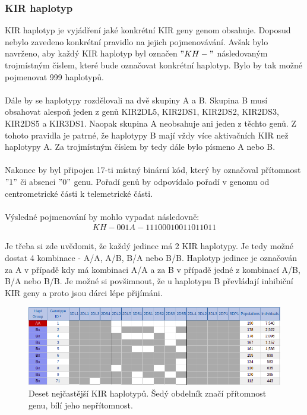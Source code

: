 \documentclass[czech,DP]{thesiskiv}
\numberwithin{equation}{section}
\begin{document}
\subsubsection{KIR haplotyp}
KIR haplotyp je vyjádření jaké konkrétní KIR geny genom obsahuje. Doposud nebylo zavedeno konkrétní pravidlo na jejich pojmenovávání. Avšak bylo navrženo, aby každý KIR haplotyp byl označen $"KH-"$ následovaným trojmístným číslem, které bude označovat konkrétní haplotyp. Bylo by tak možné pojmenovat 999 haplotypů. \cite{imgt_hla_database}
\\
\\
Dále by se haplotypy rozdělovali na dvě skupiny A a B. Skupina B musí obsahovat alespoň jeden z genů KIR2DL5, KIR2DS1, KIR2DS2, KIR2DS3, KIR2DS5 a KIR3DS1. Naopak skupina A neobsahuje ani jeden z těchto genů. Z tohoto pravidla je patrné, že haplotypy B mají vždy více aktivačních KIR než haplotypy A. Za trojmístným číslem by tedy dále bylo písmeno A nebo B.
\\
\\
Nakonec by byl připojen 17-ti místný binární kód, který by označoval přítomnost $"1"$ či absenci $"0"$ genu. Pořadí genů by odpovídalo pořadí v genomu od centrometrické části k telemetrické části.
\\
\\
Výsledné pojmenování by mohlo vypadat následovně:
\begin{align}
   \label{kir_haplotyp} KH-001A-11100010011011011
\end{align}

\noindent
Je třeba si zde uvědomit, že každý jedinec má 2 KIR haplotypy. Je tedy možné dostat 4 kombinace - A/A, A/B, B/A nebo B/B. Haplotyp jedince je označován za A v případě kdy má kombinaci A/A a za B v případě jedné z kombinací A/B, B/A nebo B/B. Je možné si povšimnout, že u haplotypu B převládají inhibiční KIR geny a proto jsou dárci lépe přijímáni.
 
\begin{figure}[H]		
		\centering
		\includegraphics[width=\textwidth]{./img/KIR_haplotypy_priklad.png}
		\caption{Deset nejčastější KIR haplotypů. Šedý obdelník značí přítomnost genu, bílí jeho nepřítomnost. \cite{kir_genotypes_10}}
		\label{fig:kir_haplotypy_10}
\end{figure}
\end{document}
